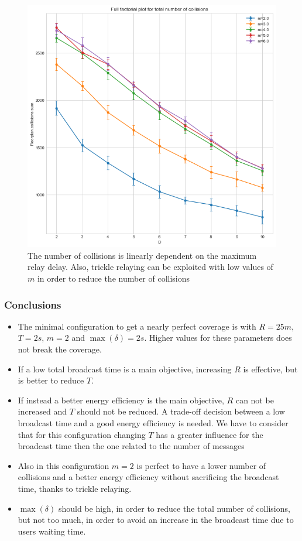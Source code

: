 \begin{figure}
	\centering
	\includegraphics[width=\textwidth]{img/ld/collisions-D-ffplot}
	\caption{The number of collisions is linearly dependent on the maximum
	relay delay. Also, trickle relaying can be exploited with low values of
	\(m\) in order to reduce the number of
	collisions}\label{fig:rectcollisionsff}
\end{figure}

\subsubsection{Conclusions}\label{subsubsec:rectconclusions}

\begin{itemize}
	\item The minimal configuration to get a nearly perfect coverage is with
		\(R\!=\!25m\), \(T\!=\!2s\), \(m\!=\!2\) and
		\(\max(\delta)\!=\!2s\). Higher values for these parameters does
		not break the coverage.
	\item If a low total broadcast time is a main objective, increasing
		\(R\) is effective, but is better to reduce \(T\).
	\item If instead a better energy efficiency is the main objective, \(R\)
		can not be increased and \(T\) should not be reduced. A
		trade-off decision between a low broadcast time and a good
		energy efficiency is needed. We have to consider that for this
		configuration changing \(T\) has a greater influence for the
		broadcast time then the one related to the number of messages
	\item Also in this configuration \(m\!=\!2\) is perfect to have a lower
		number of collisions and a better energy efficiency without
		sacrificing the broadcast time, thanks to trickle relaying.
	\item \(\max(\delta)\) should be high, in order to reduce the total
		number of collisions, but not too much, in order to avoid an
		increase in the broadcast time due to users waiting time.
\end{itemize}
